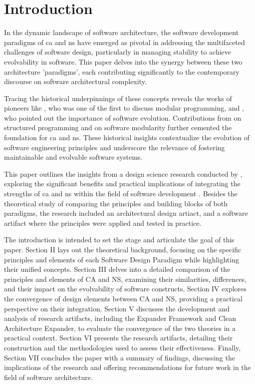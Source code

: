 \section{Introduction} \label{sec:introduction} 

In the dynamic landscape of software architecture, the software development paradigms of
\gls{ca} and \gls{ns} have emerged as pivotal in addressing the multifaceted challenges of
software design, particularly in managing stability to achieve evolvability in software.
This paper delves into the synergy between these two architecture 'paradigms', each
contributing significantly to the contemporary discourse on software architectural
complexity.

Tracing the historical underpinnings of these concepts reveals the works of pioneers like
\textcite{d_mcilroy_nato_1968}, who was one of the first to discuss modular programming,
and \textcite{lehman_programs_1980}, who pointed out the importance of software evolution.
Contributions from \textcite{dijkstra_letters_1968} on structured programming and
\textcite{parnas_criteria_1972} on software modularity further cemented the foundation for
\gls{ca} and \gls{ns}. These historical insights contextualize the evolution of software
engineering principles and underscore the relevance of fostering maintainable and
evolvable software systems.

This paper outlines the insights from a design science research conducted by
, exploring the significant benefits and practical
implications of integrating the strengths of \gls{ca} and \gls{ns} within the field of
software development \cite{koks_convergence_2023}. Besides the theoretical study of
comparing the principles and building blocks of both paradigms, the research included an
architectural design artiact, and a software artifact where the principles were applied and tested
in practice.  

The introduction is intended to set the stage and articulate the goal of this paper.
Section II lays out the theoretical background, focusing on the specific principles and
elements of each Software Design Paradigm while highlighting their unified concepts.
Section III delves into a detailed comparison of the principles and elements of CA and NS,
examining their similarities, differences, and their impact on the evolvability of
software constructs. Section IV explores the convergence of design elements between CA and
NS, providing a practical perspective on their integration. Section V discusses the
development and analysis of research artifacts, including the Expander Framework and Clean
Architecture Expander, to evaluate the convergence of the two theories in a practical
context. Section VI presents the research artifacts, detailing their construction and the
methodologies used to assess their effectiveness. Finally, Section VII concludes the paper
with a summary of findings, discussing the implications of the research and offering
recommendations for future work in the field of software architecture.